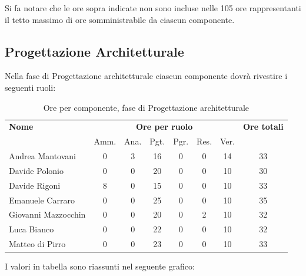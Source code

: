 Si fa notare che le ore sopra indicate non sono incluse nelle 105 ore rappresentanti il tetto massimo di ore somministrabile da ciascun componente.


\pagebreak
\subsection{Progettazione Architetturale}
Nella fase di Progettazione architetturale ciascun componente dovrà rivestire i seguenti ruoli:

\begin{table}[H]
\begin{tabular}{lccccccc}
\toprule
    \textbf{Nome}  & \multicolumn{6}{c}{\textbf{Ore per ruolo}} & \textbf{Ore totali} \\
     & Amm. & Ana. & Pgt. & Pgr. & Res. & Ver. & \\
    \midrule
    
	   Andrea Mantovani & 0 & 3 & 16 & 0 & 0 & 14 & 33 \\
	     Davide Polonio & 0 & 0 & 20 & 0 & 0 & 10 & 30 \\
	      Davide Rigoni & 8 & 0 & 15 & 0 & 0 & 10 & 33 \\
	   Emanuele Carraro & 0 & 0 & 25 & 0 & 0 & 10 & 35 \\
	Giovanni Mazzocchin & 0 & 0 & 20 & 0 & 2 & 10 & 32 \\
	        Luca Bianco & 0 & 0 & 22 & 0 & 0 & 10 & 32 \\
	    Matteo di Pirro & 0 & 0 & 23 & 0 & 0 & 10 & 33 \\
    
    \bottomrule
\end{tabular}
\caption{Ore per componente, fase di Progettazione architetturale}
\end{table}

I valori in tabella sono riassunti nel seguente grafico: \\ 

